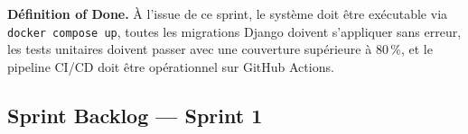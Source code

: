 \textbf{Définition of Done.} À l'issue de ce sprint, le système doit être exécutable via \texttt{docker compose up}, toutes les migrations Django doivent s'appliquer sans erreur, les tests unitaires doivent passer avec une couverture supérieure à 80\,\%, et le pipeline CI/CD doit être opérationnel sur GitHub Actions.

\setcounter{tasknum}{1}
\newcommand{\nexttask}{%
  \ifnum\value{tasknum}<10 0\fi\arabic{tasknum}%
  \stepcounter{tasknum}%
}

\newlength{\uswidth}
\setlength{\uswidth}{\dimexpr 15.0cm + 5\arrayrulewidth + 30pt\relax}

\newcommand{\usheadergreen}[2]{%
  \multicolumn{6}{|p{\uswidth}|}{%
    \cellcolor{green!8}%
    \textbf{#1} — \small\textit{#2}%
  } \\ \hline
}
\newcommand{\usheader}[2]{%
  \multicolumn{6}{|p{\uswidth}|}{%
    \cellcolor{blue!8}%
    \textbf{#1} — \small\textit{#2}%
  } \\ \hline
}

\subsection{Sprint Backlog — Sprint 1}

\begingroup
\footnotesize
\setlength{\tabcolsep}{3pt}
\renewcommand{\arraystretch}{1.6}


